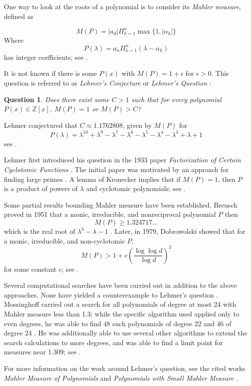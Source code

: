 \documentclass{amsart}
\theoremstyle{theorem}
\theoremstyle{theorem*}
\newtheorem{question}[theorem]{Question}
\theoremstyle{definition}
\begin{document}
One way to look at the roots of a polynomial is to consider its \textit{Mahler measure},
defined as

$$M(P) = |a_d|\Pi_{k=1}^{n}\max\{1, |\alpha_k|\}$$
Where
$$P(\lambda) = a_n \Pi_{k=1}^{n} (\lambda - \alpha_k)$$
has integer coefficients; see \cite{m}.

It is not known if there is some $P(x)$ with $M(P) = 1 + \epsilon$
for $\epsilon > 0$. This question is referred to as \textit{Lehmer's Conjecture} or \textit{Lehmer's Question} \cite{m}:
\begin{question} Does there exist some $C > 1$ such that for every polynomial
    $P(x) \in \mathbb{Z}[x]$, $M(P) = 1$ or $M(P) > C$?
\end{question}
Lehmer conjectured that $C \approx 1.1762808$, given by $M(P)$ for $$P(\lambda) =
\lambda^{10} + \lambda^9 -\lambda^7 - \lambda^6 -
\lambda^5 - \lambda^4 - \lambda^3 + \lambda + 1$$ see \cite{m}.

Lehmer first introduced his question in the 1933 paper \textit{Factorization of
    Certain Cyclotomic Functions} \cite{l}. The initial paper was motivated by
an approach for finding large primes \cite{ln}. A lemma of Kronecker implies
that if $M(P) = 1$, then $P$ is a product of powers of $\lambda$ and cyclotomic
polynomials; see \cite{ln}.

Some partial results bounding Mahler measure have been established. Breusch
proved in 1951 that a monic, irreducible, and nonreciprocal polynomial $P$ then
$$M(P) \geq 1.324717\dots$$ which is the real root of $\lambda^3 - \lambda - 1$ \cite{ln}.
Later, in 1979, Dobrowolski showed that for a monic, irreducible, and
non-cyclotomic $P$,
$$M(P) > 1 + c \left(\frac{\log \log d}{\log d}\right)^3$$ for some constant $c$;
see \cite{ln}.

Several computational searches have been carried out in addition to the above
approaches. None have yielded a counterexample to Lehmer's question \cite{m}.
Mossinghoff carried out a search for all polynomials of degree at most 24 with
Mahler measure less than 1.3; while the specific algorithm used applied only to
even degrees, he was able to find 48 such polynomials of degree 22 and 46 of
degree 24 \cite{m}. He was additionally able to use several other algorithms to
extend the search calculations to more degrees, and was able to find a limit
point for measures near 1.309; see \cite{m}.

For more information on the work around Lehmer's question, see the cited works
\textit{Mahler Measure of Polynomials} \cite{ln} and \textit{Polynomials with Small Mahler
    Measure} \cite{m}.
\end{document}
